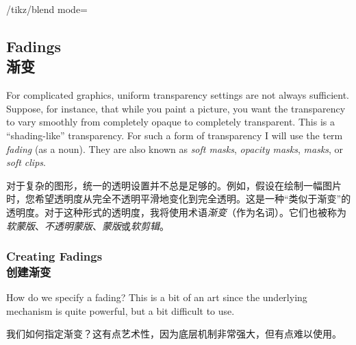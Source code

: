 \begin{key}{/tikz/blend mode=}







\end{key}


\subsection{Fadings\\渐变}

For complicated graphics, uniform transparency settings are not always
sufficient. Suppose, for instance, that while you paint a picture, you want the
transparency to vary smoothly from completely opaque to completely transparent.
This is a ``shading-like'' transparency. For such a form of transparency I will
use the term \emph{fading} (as a noun). They are also known as \emph{soft
masks}, \emph{opacity masks}, \emph{masks}, or \emph{soft clips}.

对于复杂的图形，统一的透明设置并不总是足够的。例如，假设在绘制一幅图片时，您希望透明度从完全不透明平滑地变化到完全透明。这是一种“类似于渐变”的透明度。对于这种形式的透明度，我将使用术语\emph{渐变}（作为名词）。它们也被称为\emph{软蒙版}、\emph{不透明蒙版}、\emph{蒙版}或\emph{软剪辑}。


\subsubsection{Creating Fadings\\创建渐变}

How do we specify a fading? This is a bit of an art since the underlying
mechanism is quite powerful, but a bit difficult to use.

我们如何指定渐变？这有点艺术性，因为底层机制非常强大，但有点难以使用。

